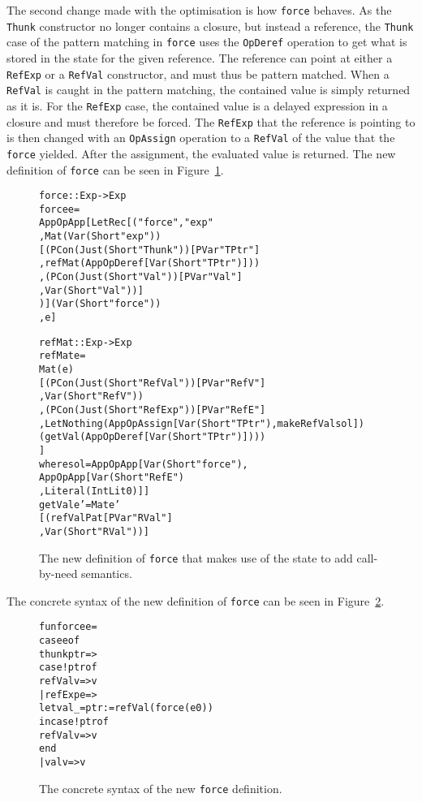 The second change made with the optimisation is how \texttt{force}
behaves. As the \texttt{Thunk} constructor no longer contains a closure, but
instead a reference, the \texttt{Thunk} case of the pattern matching in
\texttt{force} uses the \texttt{OpDeref} operation to get what is stored in
the state for the given reference. The reference can point at either a
\texttt{RefExp} or a \texttt{RefVal} constructor, and must thus be pattern
matched. When a \texttt{RefVal} is caught in the pattern matching, the contained
value is simply returned as it is. For the \texttt{RefExp} case, the contained
value is a delayed expression in a closure and must therefore be forced.
The \texttt{RefExp} that the reference is pointing to is then changed with an
\texttt{OpAssign} operation to a \texttt{RefVal} of the value that the
\texttt{force} yielded. After the assignment, the evaluated value is returned.
The new definition of \texttt{force} can be seen in Figure~\ref{fig:force2abstract}.
\begin{figure}
\begin{alltt}
  force :: Exp -> Exp
  force e =
    App OpApp [LetRec [("force", "exp"
                       , Mat (Var (Short "exp"))
                         [(PCon (Just (Short "Thunk")) [PVar "TPtr"]
                          ,refMat (App OpDeref [Var (Short "TPtr")]))
                         ,(PCon (Just (Short "Val")) [PVar "Val"]
                          , Var (Short "Val"))]
                       )] (Var (Short "force"))
              , e]

  refMat :: Exp -> Exp
  refMat e =
    Mat (e)
    [(PCon (Just (Short "RefVal")) [PVar "RefV"]
     ,Var (Short "RefV"))
    ,(PCon (Just (Short "RefExp")) [PVar "RefE"]
     ,Let Nothing (App OpAssign [Var (Short "TPtr"), makeRefVal sol])
       (getVal (App OpDeref [Var (Short "TPtr")])))
    ]
    where sol = App OpApp [Var (Short "force"),
                           App OpApp [Var (Short "RefE")
                                     ,Literal (IntLit 0)]]
          getVal e' = Mat e'
                      [(refValPat [PVar "RVal"]
                       ,Var (Short "RVal"))]
\end{alltt}
\caption{The new definition of \texttt{force} that makes use of the state to add call-by-need semantics.}
\label{fig:force2abstract}
\end{figure}
The concrete syntax of the new definition of \texttt{force} can be seen in
Figure~\ref{fig:force2Concrete}.
\begin{figure}
\begin{alltt}
  fun force e =
    case e of
      thunk ptr => 
        case !ptr of
          refVal v => v
        | refExp e =>
            let val _ = ptr := refVal (force (e 0))
            in case !ptr of
                 refVal v => v
            end
    | val v     => v
\end{alltt}
\caption{The concrete syntax of the new \texttt{force} definition.}
\label{fig:force2Concrete}
\end{figure}

